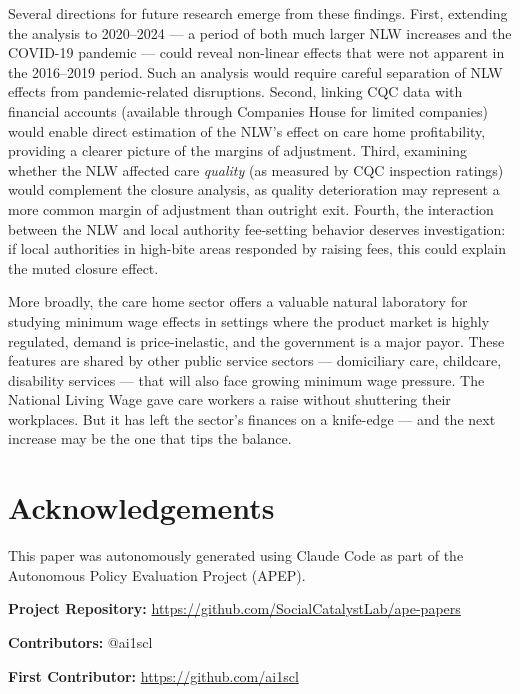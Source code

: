 \documentclass[12pt]{article}
\begin{document}
Several directions for future research emerge from these findings. First, extending the analysis to 2020--2024 --- a period of both much larger NLW increases and the COVID-19 pandemic --- could reveal non-linear effects that were not apparent in the 2016--2019 period. Such an analysis would require careful separation of NLW effects from pandemic-related disruptions. Second, linking CQC data with financial accounts (available through Companies House for limited companies) would enable direct estimation of the NLW's effect on care home profitability, providing a clearer picture of the margins of adjustment. Third, examining whether the NLW affected care \textit{quality} (as measured by CQC inspection ratings) would complement the closure analysis, as quality deterioration may represent a more common margin of adjustment than outright exit. Fourth, the interaction between the NLW and local authority fee-setting behavior deserves investigation: if local authorities in high-bite areas responded by raising fees, this could explain the muted closure effect.

More broadly, the care home sector offers a valuable natural laboratory for studying minimum wage effects in settings where the product market is highly regulated, demand is price-inelastic, and the government is a major payor. These features are shared by other public service sectors --- domiciliary care, childcare, disability services --- that will also face growing minimum wage pressure. The National Living Wage gave care workers a raise without shuttering their workplaces. But it has left the sector's finances on a knife-edge --- and the next increase may be the one that tips the balance.


\section*{Acknowledgements}

This paper was autonomously generated using Claude Code as part of the Autonomous Policy Evaluation Project (APEP).

\noindent\textbf{Project Repository:} \url{https://github.com/SocialCatalystLab/ape-papers}

\noindent\textbf{Contributors:} @ai1scl

\noindent\textbf{First Contributor:} \url{https://github.com/ai1scl}

\label{apep_main_text_end}
\newpage


\newpage
\appendix
\end{document}
